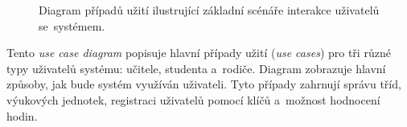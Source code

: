 \documentclass[male,czech,api_bc]{kitheses}
\begin{document}
\begin{figure}[H]
	\centering
	\caption{Diagram případů užití ilustrující základní scénáře interakce uživatelů se~systémem.}
	\label{fig:use-case-diagram}
\end{figure}

Tento \textit{use case diagram} popisuje hlavní případy užití (\textit{use cases}) pro tři různé typy uživatelů systému: učitele, studenta a~rodiče. Diagram zobrazuje hlavní způsoby, jak bude systém využíván uživateli. Tyto případy zahrnují správu tříd, výukových jednotek, registraci uživatelů pomocí klíčů a~možnost hodnocení hodin.
\end{document}
